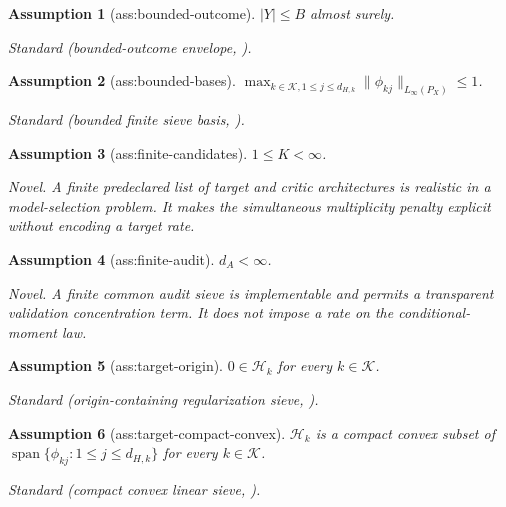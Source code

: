 \documentclass{article}
\newtheorem{assumption}{Assumption}
\begin{document}
\begin{assumption}[ass:bounded-outcome]\label{ass:bounded-outcome}
\(|Y|\le B\) almost surely.
\par\smallskip\noindent\emph{Standard} (bounded-outcome envelope, \cite{DikkalaLewisMackeySyrgkanis2020Minimax}).
\end{assumption}

\begin{assumption}[ass:bounded-bases]\label{ass:bounded-bases}
\(\max_{k\in\mathcal K,1\le j\le d_{H,k}}\|\phi_{kj}\|_{L_\infty(P_X)}\le1\).
\par\smallskip\noindent\emph{Standard} (bounded finite sieve basis, \cite{LiLanSyrgkanisWangUehara2024RegularizedDeepIV}).
\end{assumption}

\begin{assumption}[ass:finite-candidates]\label{ass:finite-candidates}
\(1\le K<\infty\).
\par\smallskip\noindent\emph{Novel.} A finite predeclared list of target and critic architectures is realistic in a model-selection problem. It makes the simultaneous multiplicity penalty explicit without encoding a target rate.
\end{assumption}

\begin{assumption}[ass:finite-audit]\label{ass:finite-audit}
\(d_A<\infty\).
\par\smallskip\noindent\emph{Novel.} A finite common audit sieve is implementable and permits a transparent validation concentration term. It does not impose a rate on the conditional-moment law.
\end{assumption}

\begin{assumption}[ass:target-origin]\label{ass:target-origin}
\(0\in\mathcal H_k\) for every \(k\in\mathcal K\).
\par\smallskip\noindent\emph{Standard} (origin-containing regularization sieve, \cite{BennettKallusMaoNeweySyrgkanisUehara2023SourceConditionDR}).
\end{assumption}

\begin{assumption}[ass:target-compact-convex]\label{ass:target-compact-convex}
\(\mathcal H_k\) is a compact convex subset of \(\operatorname{span}\{\phi_{kj}:1\le j\le d_{H,k}\}\) for every \(k\in\mathcal K\).
\par\smallskip\noindent\emph{Standard} (compact convex linear sieve, \cite{LiLanSyrgkanisWangUehara2024RegularizedDeepIV}).
\end{assumption}
\end{document}
